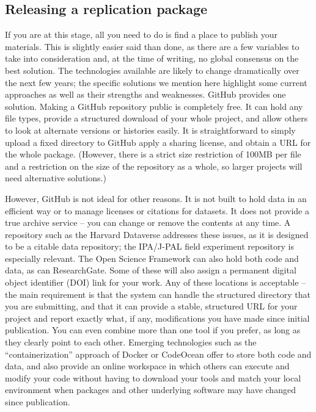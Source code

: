 \subsection{Releasing a replication package}

If you are at this stage,
all you need to do is find a place to publish your materials.
This is slightly easier said than done,
as there are a few variables to take into consideration
and, at the time of writing, no global consensus on the best solution.
The technologies available are likely to change dramatically
over the next few years;
the specific solutions we mention here highlight some current approaches
as well as their strengths and weaknesses.
GitHub provides one solution.
Making a GitHub repository public is completely free.
It can hold any file types,
provide a structured download of your whole project,
and allow others to look at alternate versions or histories easily.
It is straightforward to simply upload a fixed directory to GitHub
apply a sharing license, and obtain a URL for the whole package.
(However, there is a strict size restriction of 100MB per file and
a restriction on the size of the repository as a whole,
so larger projects will need alternative solutions.)

However, GitHub is not ideal for other reasons.
It is not built to hold data in an efficient way
or to manage licenses or citations for datasets.
It does not provide a true archive service --
you can change or remove the contents at any time.
A repository such as the Harvard Dataverse
addresses these issues, as it is designed to be a citable data repository;
the IPA/J-PAL field experiment repository is especially relevant.
The Open Science Framework
can also hold both code and data,
as can ResearchGate.
Some of these will also assign a permanent digital object identifier (DOI) link for your work.
Any of these locations is acceptable --
the main requirement is that the system can handle
the structured directory that you are submitting,
and that it can provide a stable, structured URL for your project
and report exactly what, if any, modifications you have made since initial publication.
You can even combine more than one tool if you prefer,
as long as they clearly point to each other.
Emerging technologies such as the ``containerization'' approach of Docker or CodeOcean
offer to store both code and data,
and also provide an online workspace in which others can execute and modify your code
without having to download your tools and match your local environment
when packages and other underlying software may have changed since publication.

